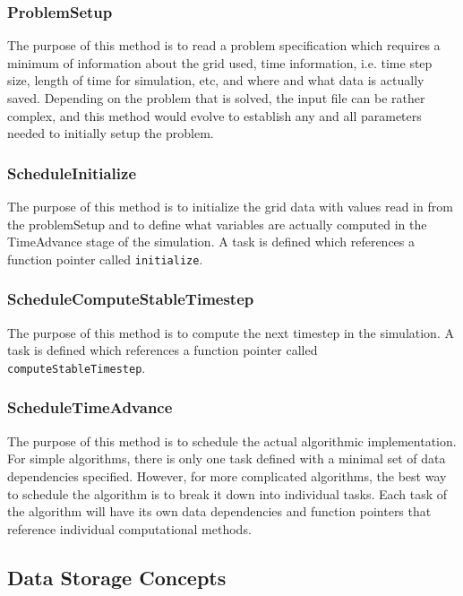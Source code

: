\documentclass[12pt]{report}
\begin{document}
\subsubsection{ProblemSetup}



The purpose of this method is to read a problem specification which
requires a minimum of information about the grid used, time
information, i.e. time step size, length of time for simulation, etc,
and where and what data is actually saved.  Depending on the problem
that is solved, the input file can be rather complex, and this method
would evolve to establish any and all parameters needed to initially
setup the problem.

\subsubsection{ScheduleInitialize}

The purpose of this method is to initialize the grid data with values
read in from the problemSetup and to define what variables are
actually computed in the TimeAdvance stage of the simulation.  A task
is defined which references a function pointer called
\texttt{initialize}.

\subsubsection{ScheduleComputeStableTimestep}

The purpose of this method is to compute the next timestep in the
simulation.  A task is defined which references a function pointer
called \texttt{computeStableTimestep}.

\subsubsection{ScheduleTimeAdvance}

The purpose of this method is to schedule the actual algorithmic
implementation.  For simple algorithms, there is only one task defined
with a minimal set of data dependencies specified.  However, for more
complicated algorithms, the best way to schedule the algorithm is to
break it down into individual tasks.  Each task of the algorithm will
have its own data dependencies and function pointers that reference
individual computational methods.

\subsection{Data Storage Concepts}
\end{document}
